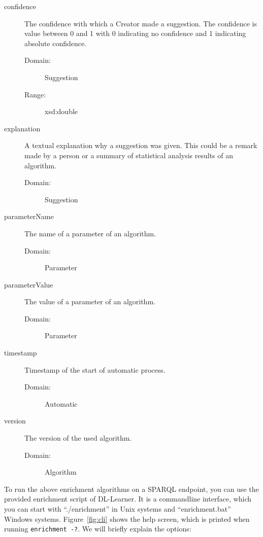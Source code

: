 \documentclass[a4paper,12pt]{scrartcl}
\begin{document}
\begin{description}
  \item[confidence] The confidence with which a Creator made a suggestion. The confidence is value between 0 and 1 with 0 indicating no confidence and 1 indicating absolute confidence.
    \begin{description}
      \item[Domain:] Suggestion
      \item[Range:] xsd:double
    \end{description}
  \item[explanation] A textual explanation why a suggestion was given. This could be a remark made by a person or a summary of statistical analysis results of an algorithm.
    \begin{description}
      \item[Domain:] Suggestion
    \end{description}
  \item[parameterName] The name of a parameter of an algorithm.
    \begin{description}
      \item[Domain:] Parameter
    \end{description}
  \item[parameterValue] The value of a parameter of an algorithm.
    \begin{description}
      \item[Domain:] Parameter
    \end{description}
  \item[timestamp] Timestamp of the start of automatic process.
    \begin{description}
      \item[Domain:] Automatic
    \end{description}
  \item[version] The version of the used algorithm.
    \begin{description}
      \item[Domain:] Algorithm
    \end{description}
\end{description}

To run the above enrichment algorithms on a SPARQL endpoint, you can use the provided enrichment script of DL-Learner.
It is a commandline interface, which you can start with ``./enrichment'' in Unix systems and ``enrichment.bat'' Windows systems.
Figure~\ref{fig:cli} shows the help screen, which is printed when running \verb|enrichment -?|.
We will briefly explain the options: 
\end{document}

